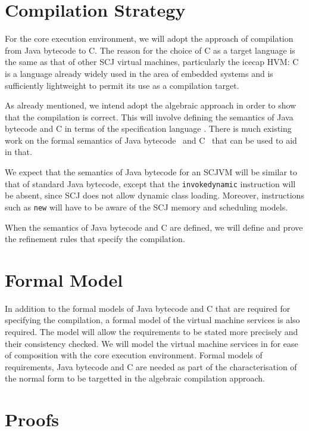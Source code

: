 \documentclass[a4paper,10pt]{report}
\begin{document}
\section{Compilation Strategy}

For the core execution environment, we will adopt the approach of
compilation from Java bytecode to C. The reason for the choice of C as
a target language is the same as that of other SCJ virtual machines,
particularly the icecap HVM: C is a language already widely used in
the area of embedded systems and is sufficiently lightweight to permit
its use as a compilation target.

As already mentioned, we intend adopt the algebraic approach in order to show
that the compilation is correct.  This will involve defining the semantics of
Java bytecode and C in terms of the specification language \Circus{}.  There is
much existing work on the formal semantics of Java bytecode~\cite{bertelsen2000,
  jones1998, stark2001, alves1999a, bogdanas2015, lochbihler2012a} and
C~\cite{campbell2012, ellison2012, krebbers2014} that can be used to aid in
that.

We expect that the semantics of Java bytecode for an SCJVM will be similar to
that of standard Java bytecode, except that the \texttt{invokedynamic}
instruction will be absent, since SCJ does not allow dynamic class loading.
Moreover, instructions such as \texttt{new} will have to be aware of the SCJ
memory and scheduling models.

When the semantics of Java bytecode and C are defined, we will define and prove
the refinement rules that specify the compilation.

\section{Formal Model}

In addition to the formal models of Java bytecode and C that are required for
specifying the compilation, a formal model of the virtual machine services is
also required.  The model will allow the requirements to be stated more
precisely and their consistency checked.  We will model the virtual machine
services in \Circus{} for ease of composition with the core execution
environment.  Formal models of requirements, Java bytecode and C are needed as
part of the characterisation of the normal form to be targetted in the algebraic
compilation approach. 

\section{Proofs}
\end{document}
